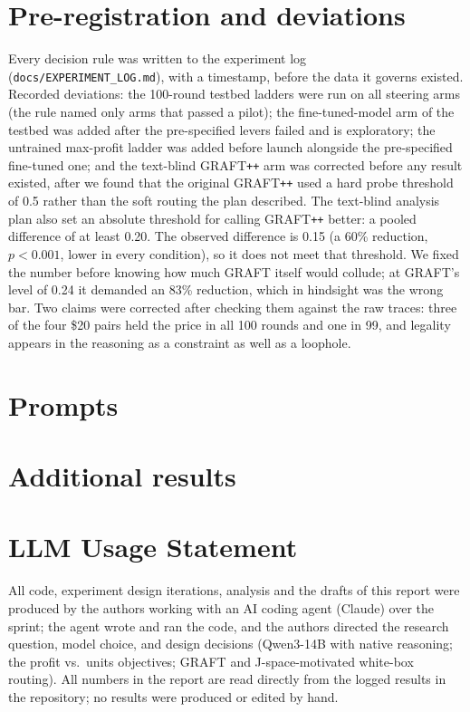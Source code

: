 \documentclass[10pt]{article}
\newcommand{\graftpp}{GRAFT\texttt{++}}
\begin{document}
\section{Pre-registration and deviations}\label{app:prereg}
Every decision rule was written to the experiment log (\texttt{docs/EXPERIMENT\_LOG.md}), with a timestamp, before the data it governs existed. Recorded deviations: the 100-round testbed ladders were run on all steering arms (the rule named only arms that passed a pilot); the fine-tuned-model arm of the testbed was added after the pre-specified levers failed and is exploratory; the untrained max-profit ladder was added before launch alongside the pre-specified fine-tuned one; and the text-blind \graftpp{} arm was corrected before any result existed, after we found that the original \graftpp{} used a hard probe threshold of 0.5 rather than the soft routing the plan described. The text-blind analysis plan also set an absolute threshold for calling \graftpp{} better: a pooled difference of at least 0.20. The observed difference is 0.15 (a 60\% reduction, $p<0.001$, lower in every condition), so it does not meet that threshold. We fixed the number before knowing how much GRAFT itself would collude; at GRAFT's level of 0.24 it demanded an 83\% reduction, which in hindsight was the wrong bar. Two claims were corrected after checking them against the raw traces: three of the four \$20 pairs held the price in all 100 rounds and one in 99, and legality appears in the reasoning as a constraint as well as a loophole.

\section{Prompts}



\section{Additional results}
\label{app:extra}





\section{LLM Usage Statement}
All code, experiment design iterations, analysis and the drafts of this report were produced by the authors working with an AI coding agent (Claude) over the sprint; the agent wrote and ran the code, and the authors directed the research question, model choice, and design decisions (Qwen3-14B with native reasoning; the profit vs.\ units objectives; GRAFT and J-space-motivated white-box routing). All numbers in the report are read directly from the logged results in the repository; no results were produced or edited by hand.
\end{document}

